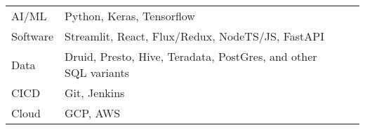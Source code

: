 \documentclass[a4paper, 9pt]{article} %
\begin{document}
\begin{tabular}{llp{11cm}}
AI/ML &Python, Keras, Tensorflow\\
Software &Streamlit, React, Flux/Redux, NodeTS/JS, FastAPI\\
Data &Druid, Presto, Hive, Teradata, PostGres, and other SQL variants\\
CICD &Git, Jenkins\\
Cloud &GCP, AWS



\end{tabular}



\end{document}
